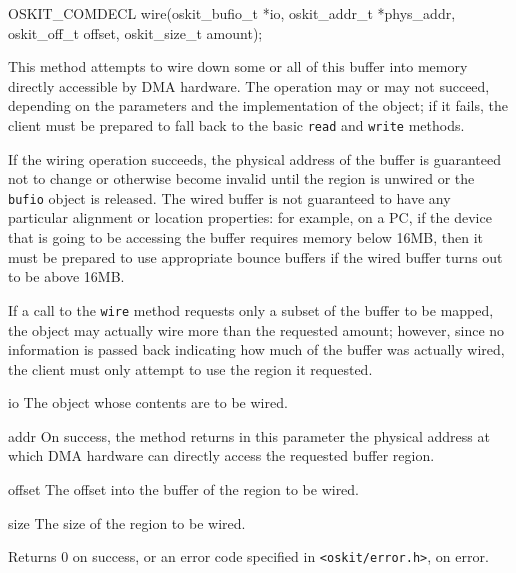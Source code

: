\begin{apisyn}

	\funcproto OSKIT_COMDECL
	wire(oskit_bufio_t *io, \outparam oskit_addr_t *phys_addr,
	     oskit_off_t offset, oskit_size_t amount);
\end{apisyn}
\begin{apidesc}
	This method attempts to wire down some or all of this buffer
	into memory directly accessible by DMA hardware.
	The operation may or may not succeed,
	depending on the parameters and the implementation of the object;
	if it fails, the client must be prepared
	to fall back to the basic \texttt{read} and \texttt{write} methods.

	If the wiring operation succeeds,
	the physical address of the buffer
	is guaranteed not to change or otherwise become invalid
	until the region is unwired or the \texttt{bufio} object is released.
	The wired buffer is not guaranteed
	to have any particular alignment or location properties:
	for example, on a PC,
	if the device that is going to be accessing the buffer
	requires memory below 16MB,
	then it must be prepared to use appropriate bounce buffers
	if the wired buffer turns out to be above 16MB.

	If a call to the \texttt{wire} method
	requests only a subset of the buffer to be mapped,
	the object may actually wire more than the requested amount;
	however, since no information is passed back
	indicating how much of the buffer was actually wired,
	the client must only attempt to use the region it requested.
\end{apidesc}
\begin{apiparm}
	\item[io]
		The object whose contents are to be wired.
	\item[addr]
		On success,
		the method returns in this parameter
		the physical address at which DMA hardware
		can directly access the requested buffer region.
	\item[offset]
		The offset into the buffer of the region to be wired.
	\item[size]
		The size of the region to be wired.
\end{apiparm}
\begin{apiret}
	Returns 0 on success, or an error code specified in
	{\tt <oskit/error.h>}, on error.
\end{apiret}

